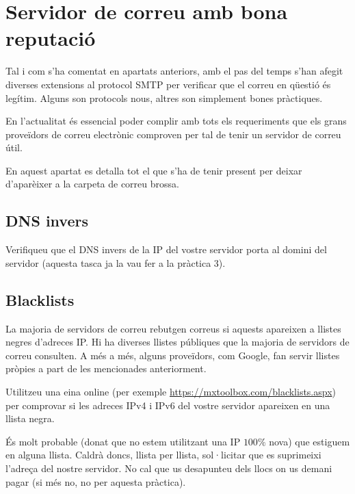 \documentclass{practicaitic}
\begin{document}
\section{Servidor de correu amb bona reputació}
\label{sec:reputation}

Tal i com s'ha comentat en apartats anteriors, amb el pas del temps s'han
afegit diverses extensions al protocol SMTP per verificar que el correu en
qüestió és legítim. Alguns son protocols nous, altres son simplement bones
pràctiques.

En l'actualitat és essencial poder complir amb tots els requeriments que els
grans proveïdors de correu electrònic comproven per tal de tenir un servidor
de correu útil.

En aquest apartat es detalla tot el que s'ha de tenir present per deixar
d'aparèixer a la carpeta de correu brossa.

\subsection{DNS invers}

\begin{tasca}
  Verifiqueu que el DNS invers de la IP del vostre servidor porta al domini
  del servidor (aquesta tasca ja la vau fer a la pràctica 3).
\end{tasca}

\subsection{Blacklists}

La majoria de servidors de correu rebutgen correus si aquests apareixen a
llistes negres d'adreces IP. Hi ha diverses llistes públiques que la majoria
de servidors de correu consulten.
A més a més, alguns proveïdors, com Google, fan servir llistes pròpies a part
de les mencionades anteriorment.

\begin{tasca}
  Utilitzeu una eina online (per exemple \url{https://mxtoolbox.com/blacklists.aspx})
  per comprovar si les adreces IPv4 i IPv6 del vostre servidor apareixen en una
  llista negra.
\end{tasca}

És molt probable (donat que no estem utilitzant una IP $100\%$ nova) que
estiguem en alguna llista. Caldrà doncs, llista per llista, sol·licitar
que es suprimeixi l'adreça del nostre servidor. No cal que us desapunteu
dels llocs on us demani pagar (si més no, no per aquesta pràctica).
\end{document}
